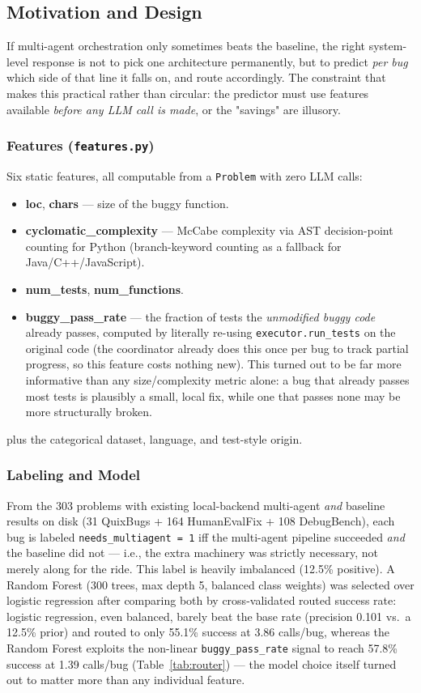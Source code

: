 \documentclass[conference]{IEEEtran}
\begin{document}
\subsection{Motivation and Design}
If multi-agent orchestration only sometimes beats the baseline, the right system-level response is not to pick one architecture permanently, but to predict \emph{per bug} which side of that line it falls on, and route accordingly. The constraint that makes this practical rather than circular: the predictor must use features available \emph{before any LLM call is made}, or the "savings" are illusory.

\subsubsection{Features (\texttt{features.py})}
Six static features, all computable from a \texttt{Problem} with zero LLM calls:
\begin{itemize}
    \item \textbf{loc}, \textbf{chars} — size of the buggy function.
    \item \textbf{cyclomatic\_complexity} — McCabe complexity via AST decision-point counting for Python (branch-keyword counting as a fallback for Java/C++/JavaScript).
    \item \textbf{num\_tests}, \textbf{num\_functions}.
    \item \textbf{buggy\_pass\_rate} — the fraction of tests the \emph{unmodified buggy code} already passes, computed by literally re-using \texttt{executor.run\_tests} on the original code (the coordinator already does this once per bug to track partial progress, so this feature costs nothing new). This turned out to be far more informative than any size/complexity metric alone: a bug that already passes most tests is plausibly a small, local fix, while one that passes none may be more structurally broken.
\end{itemize}
plus the categorical dataset, language, and test-style origin.

\subsubsection{Labeling and Model}
From the 303 problems with existing local-backend multi-agent \emph{and} baseline results on disk (31 QuixBugs + 164 HumanEvalFix + 108 DebugBench), each bug is labeled \texttt{needs\_multiagent = 1} iff the multi-agent pipeline succeeded \emph{and} the baseline did not — i.e., the extra machinery was strictly necessary, not merely along for the ride. This label is heavily imbalanced (12.5\% positive). A Random Forest (300 trees, max depth 5, balanced class weights) was selected over logistic regression after comparing both by cross-validated routed success rate: logistic regression, even balanced, barely beat the base rate (precision 0.101 vs.\ a 12.5\% prior) and routed to only 55.1\% success at 3.86 calls/bug, whereas the Random Forest exploits the non-linear \texttt{buggy\_pass\_rate} signal to reach 57.8\% success at 1.39 calls/bug (Table~\ref{tab:router}) — the model choice itself turned out to matter more than any individual feature.
\end{document}
